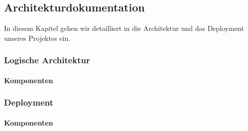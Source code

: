 \subsection{Architekturdokumentation}
\label{architektur}
In diesem Kapitel gehen wir detailliert in die Architektur und das Deployment unseres Projektes ein.

\subsubsection{Logische Architektur}

\paragraph*{Komponenten}
\subsubsection{Deployment}
\paragraph*{Komponenten}
